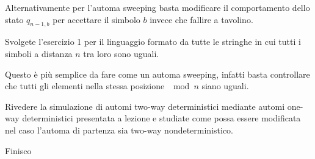\documentclass[12pt, answers]{exam}
\begin{document}
\begin{questions}
\begin{solution}
		Alternativamente per l'automa sweeping basta modificare il comportamento dello stato $q_{n - 1, b}$ per accettare il simbolo $b$ invece che fallire a tavolino.
	\end{solution}
	\question Svolgete l'esercizio 1 per il linguaggio formato da tutte le stringhe in cui tutti i simboli a distanza $n$ tra loro sono uguali.
	\begin{solution}
		Questo è più semplice da fare come un automa sweeping, infatti basta controllare che tutti gli elementi nella stessa posizione $\mod n$ siano uguali.
	\end{solution}
	\question Rivedere la simulazione di automi two-way deterministici mediante automi one-way deterministici presentata a lezione e studiate come possa essere modificata nel caso l'automa di partenza sia two-way nondeterministico.
	\begin{solution}
		Finisco
	\end{solution}
\end{questions}
\end{document}
